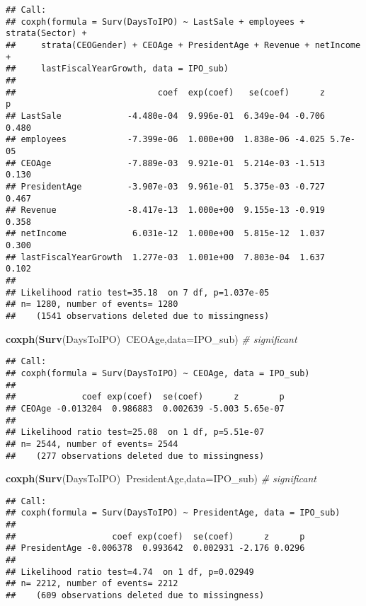 \documentclass[]{article}
\newenvironment{Shaded}{\begin{snugshade}}{\end{snugshade}}
\newcommand{\CommentTok}[1]{\textcolor[rgb]{0.56,0.35,0.01}{\textit{#1}}}
\newcommand{\DataTypeTok}[1]{\textcolor[rgb]{0.13,0.29,0.53}{#1}}
\newcommand{\KeywordTok}[1]{\textcolor[rgb]{0.13,0.29,0.53}{\textbf{#1}}}
\newcommand{\NormalTok}[1]{#1}
\newcommand{\OperatorTok}[1]{\textcolor[rgb]{0.81,0.36,0.00}{\textbf{#1}}}
\begin{document}
\begin{verbatim}
## Call:
## coxph(formula = Surv(DaysToIPO) ~ LastSale + employees + strata(Sector) + 
##     strata(CEOGender) + CEOAge + PresidentAge + Revenue + netIncome + 
##     lastFiscalYearGrowth, data = IPO_sub)
## 
##                            coef  exp(coef)   se(coef)      z       p
## LastSale             -4.480e-04  9.996e-01  6.349e-04 -0.706   0.480
## employees            -7.399e-06  1.000e+00  1.838e-06 -4.025 5.7e-05
## CEOAge               -7.889e-03  9.921e-01  5.214e-03 -1.513   0.130
## PresidentAge         -3.907e-03  9.961e-01  5.375e-03 -0.727   0.467
## Revenue              -8.417e-13  1.000e+00  9.155e-13 -0.919   0.358
## netIncome             6.031e-12  1.000e+00  5.815e-12  1.037   0.300
## lastFiscalYearGrowth  1.277e-03  1.001e+00  7.803e-04  1.637   0.102
## 
## Likelihood ratio test=35.18  on 7 df, p=1.037e-05
## n= 1280, number of events= 1280 
##    (1541 observations deleted due to missingness)
\end{verbatim}

\begin{Shaded}
\begin{Highlighting}[]
\KeywordTok{coxph}\NormalTok{(}\KeywordTok{Surv}\NormalTok{(DaysToIPO)}\OperatorTok{~}\NormalTok{CEOAge,}\DataTypeTok{data=}\NormalTok{IPO_sub) }\CommentTok{# significant}
\end{Highlighting}
\end{Shaded}

\begin{verbatim}
## Call:
## coxph(formula = Surv(DaysToIPO) ~ CEOAge, data = IPO_sub)
## 
##             coef exp(coef)  se(coef)      z        p
## CEOAge -0.013204  0.986883  0.002639 -5.003 5.65e-07
## 
## Likelihood ratio test=25.08  on 1 df, p=5.51e-07
## n= 2544, number of events= 2544 
##    (277 observations deleted due to missingness)
\end{verbatim}

\begin{Shaded}
\begin{Highlighting}[]
\KeywordTok{coxph}\NormalTok{(}\KeywordTok{Surv}\NormalTok{(DaysToIPO)}\OperatorTok{~}\NormalTok{PresidentAge,}\DataTypeTok{data=}\NormalTok{IPO_sub) }\CommentTok{# significant}
\end{Highlighting}
\end{Shaded}

\begin{verbatim}
## Call:
## coxph(formula = Surv(DaysToIPO) ~ PresidentAge, data = IPO_sub)
## 
##                   coef exp(coef)  se(coef)      z      p
## PresidentAge -0.006378  0.993642  0.002931 -2.176 0.0296
## 
## Likelihood ratio test=4.74  on 1 df, p=0.02949
## n= 2212, number of events= 2212 
##    (609 observations deleted due to missingness)
\end{verbatim}
\end{document}
